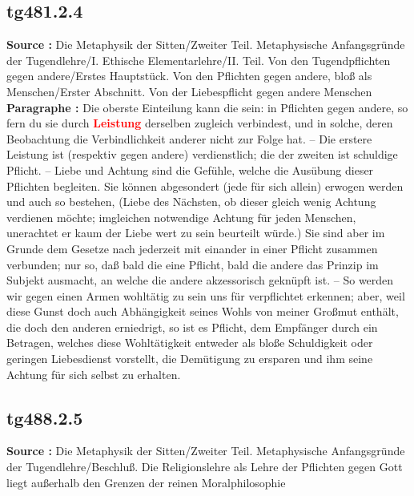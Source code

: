 \documentclass[a4paper,12pt,twoside]{book}
\newcommand{\match}[1]{\textcolor{red}{\textbf{#1}}}
\begin{document}
	\subsection*{tg481.2.4} 
	\textbf{Source : }Die Metaphysik der Sitten/Zweiter Teil. Metaphysische Anfangsgründe der Tugendlehre/I. Ethische Elementarlehre/II. Teil. Von den Tugendpflichten gegen andere/Erstes Hauptstück. Von den Pflichten gegen andere, bloß als Menschen/Erster Abschnitt. Von der Liebespflicht gegen andere Menschen\\  
	
	\textbf{Paragraphe : }Die oberste Einteilung kann die sein: in Pflichten gegen andere, so fern du sie durch \match{Leistung} derselben zugleich verbindest, und in solche, deren Beobachtung die Verbindlichkeit anderer nicht zur Folge hat. – Die erstere Leistung ist (respektiv gegen andere) verdienstlich; die der zweiten ist schuldige Pflicht. – Liebe und Achtung sind die Gefühle, welche die Ausübung dieser Pflichten begleiten. Sie können abgesondert (jede für sich allein) erwogen werden und auch so bestehen, (Liebe des Nächsten, ob dieser gleich wenig Achtung verdienen möchte; imgleichen notwendige Achtung für jeden Menschen, unerachtet er kaum der Liebe wert zu sein beurteilt würde.) Sie sind aber im Grunde dem Gesetze nach jederzeit mit einander in einer Pflicht zusammen verbunden; nur so, daß bald die eine Pflicht, bald die andere das Prinzip im Subjekt ausmacht, an welche die andere akzessorisch geknüpft ist. – So werden wir gegen einen Armen wohltätig zu sein uns für verpflichtet erkennen; aber, weil diese Gunst doch auch Abhängigkeit seines Wohls von meiner Großmut enthält, die doch den anderen erniedrigt, so ist es Pflicht, dem Empfänger durch ein Betragen, welches diese Wohltätigkeit entweder als bloße Schuldigkeit oder geringen Liebesdienst vorstellt, die Demütigung zu ersparen und ihm seine Achtung für sich selbst zu erhalten. 
	
	\subsection*{tg488.2.5} 
	\textbf{Source : }Die Metaphysik der Sitten/Zweiter Teil. Metaphysische Anfangsgründe der Tugendlehre/Beschluß. Die Religionslehre als Lehre der Pflichten gegen Gott liegt außerhalb den Grenzen der reinen Moralphilosophie\\  
	
\end{document}
